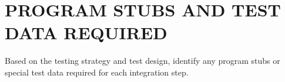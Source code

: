 \section{PROGRAM STUBS AND TEST DATA REQUIRED}
Based  on  the  testing  strategy  and  test  design,  identify  any  program  stubs  or  special  test  data  required for each integration step. 
